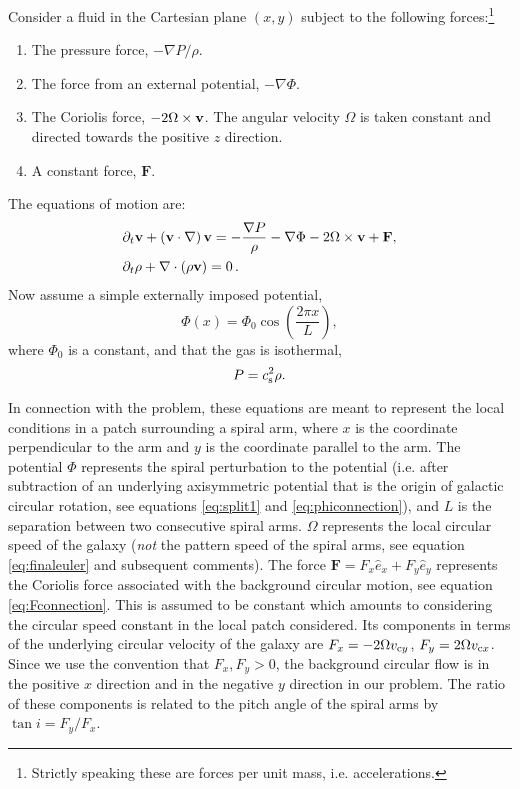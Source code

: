 \documentclass[useAMS,usenatbib]{mn2e}
\def\pa{\partial}
\begin{document}
Consider a fluid in the Cartesian plane $(x,y)$ subject to the following forces:\footnote{Strictly speaking these are forces per unit mass, i.e. accelerations.} 
\begin{enumerate}
\item The pressure force,  $-{\nabla P}/{\rho}$.
\item The force from an external potential, $-\nabla \Phi$.
\item The Coriolis force, $-2 \Omega \times \mathbf{v}$. The angular velocity $\Omega$ is taken constant and directed towards the positive $z$ direction.
\item A constant force, $\mathbf{F}$. 
\end{enumerate}
The equations of motion are:
%
\begin{align} 
	& \pa_t \bfv + \left( \bfv \cdot \nabla \right) \bfv  = - \frac{\nabla P}{\rho} -\nabla \Phi - 2 \Omega \times \bfv + \mathbf{F} \label{eq:eom1}, \\ 
	& \pa_t \rho + \nabla \cdot \left( \rho \bfv \right) = 0 \, . \label{eq:eom2}
\end{align}
%
Now assume a simple externally imposed potential,
\begin{equation}
\Phi(x) = \Phi_0 \cos\left( \frac{2 \pi x}{L} \right),
\end{equation}
where $\Phi_0$ is a constant, and that the gas is isothermal,
\begin{equation}
P = c_{\rm s}^2 \rho. \label{eq:isothermal}
\end{equation}

In connection with the \cite{Roberts1969} problem, these equations are meant to represent the local conditions in a patch surrounding a spiral arm, where $x$ is the coordinate perpendicular to the arm and $y$ is the coordinate parallel to the arm. The potential $\Phi$ represents the spiral perturbation to the potential (i.e. after subtraction of an underlying axisymmetric potential that is the origin of galactic circular rotation, see equations \ref{eq:split1} and \ref{eq:phiconnection}), and $L$ is the separation between two consecutive spiral arms. $\Omega$ represents the local circular speed of the galaxy (\emph{not} the pattern speed of the spiral arms, see equation \ref{eq:finaleuler} and subsequent comments). The force $\mathbf{F} = F_x \hat{e}_x + F_y\hat{e}_y$ represents the Coriolis force associated with the background circular motion, see equation \eqref{eq:Fconnection}. This is assumed to be constant which amounts to considering the circular speed constant in the local patch considered. Its components in terms of the underlying circular velocity of the galaxy are $F_x = - 2 \Omega v_{{\rm c}y}$, $F_y = 2 \Omega v_{{\rm c}x}$. Since we use the convention that $F_x,F_y>0$, the background circular flow is in the positive $x$ direction and in the negative $y$ direction in our problem. The ratio of these components is related to the pitch angle of the spiral arms by $\tan i = F_y / F_x $.
\end{document}
